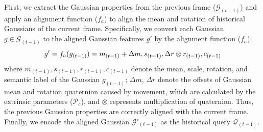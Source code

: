 \documentclass[journal]{IEEEtran}
\begin{document}
First, we extract the Gaussian properties from the previous frame ({\small $\mathcal{G}_{(t-1)}$}) and apply an alignment function ($f_{a}$) to align the mean and rotation of historical Gaussians of the current frame.  
Specifically, we convert each Gaussian {\small $g \in \mathcal{G}_{(t-1)}$} to the aligned Gaussian features $g'$ by the alignment function ($f_{a}$):
\begin{equation} \small
g' = f_{a}(g_{(t-1)}) = m_{(t-1)} +\Delta m, s_{(t-1)},\Delta r \otimes r_{(t-1)},c_{(t-1)}
\end{equation}
where $m_{(t-1)}, s_{(t-1)}, r_{(t-1)}, c_{(t-1)}$ denote the mean, scale, rotation, and semantic label of the Gaussian $g_{(t-1)}$; {\small $\Delta m$}, {\small $\Delta r$} denote the offsets of Gaussian mean and rotation quaternion caused by movement, which are calculated by the extrinsic parameters ({\small $\mathcal{P}_e$}), and $\otimes$ represents multiplication of quaternion.
Thus, the previous Gaussian properties are correctly aligned with the current frame.
Finally, we encode the aligned Gaussian {\small $\mathcal{G}'_{(t-1)}$}
as the historical query {\small $\mathcal{Q}_{(t-1)}$}.



\end{document}
